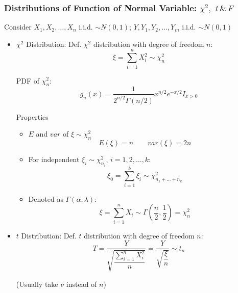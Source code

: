     \subsubsection{Distributions of Function of Normal Variable: $\chi^2,$ $t\,\& \,F$}\label{chi2_t_F_properties}
        Consider $X_1,X_2,\ldots,X_n$ i.i.d. $\sim N(0,1)$; $Y,Y_1,Y_2,\ldots,Y_m$ i.i.d. $\sim N(0,1)$
        \begin{itemize}
            \item $\chi^2$ Distribution: Def. $\chi^2$ distribution with degree of freedom $n$:
            \begin{equation}        
                \xi =\sum_{i=1}^n X_i^2\sim \chi^2_n
            \end{equation}

            PDF of $\chi^2_n$:
            \begin{equation}        
                g_n(x)=\dfrac{1}{2^{n/2}\Gamma(n/2)}x^{n/2}e^{-x/2}I_{x>0}  
            \end{equation}

            Properties
            \begin{itemize}
                \item $E$ and $var$ of $\xi\sim\chi^2_n$
                \begin{equation}            E(\xi)=n\qquad var(\xi)=2n\end{equation}
                \item For independent $\xi_i\sim\chi^2_{n_i},\, i=1,2,\ldots,k$:\begin{equation}            
                    \xi_0=\sum_{i=1}^k\xi_i\sim\chi^2_{n_1+\ldots+n_k}\end{equation}
                \item Denoted as $\Gamma(\alpha,\lambda)$: \begin{equation}            \xi=\sum_{i=1}^nX_i\sim\Gamma(\frac{n}{2},\frac{1}{2})=\chi^2_n\end{equation}
            \end{itemize}
            \item $t$ Distribution: Def. $t$ distribution with degree of freedom $n$:
            \begin{equation}        
                T=\frac{Y}{\sqrt{\dfrac{\sum_{i=1}^nX_i^2}{n}}}=\frac{Y}{\sqrt{\dfrac{\xi}{n}}}\sim t_n
            \end{equation}

            (Usually take $\nu$ instead of $n$)


\end{itemize}
